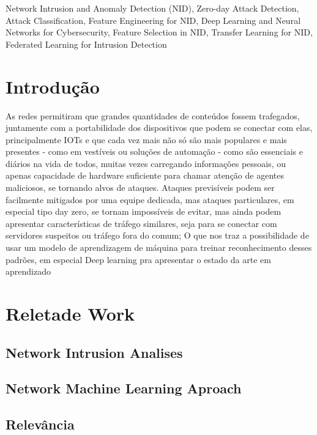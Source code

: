 \documentclass[conference]{IEEEtran}
\begin{document}
\begin{IEEEkeywords}
Network Intrusion and Anomaly Detection (NID), Zero-day Attack Detection, Attack Classification, Feature Engineering for NID, Deep Learning and Neural Networks for Cybersecurity, Feature Selection in NID, Transfer Learning for NID, Federated Learning for Intrusion Detection
\end{IEEEkeywords}

\section{Introdução}

As redes permitiram que grandes quantidades de conteúdos fossem trafegados, juntamente com a portabilidade dos dispositivos que podem se conectar com elas, principalmente IOTs e que cada vez mais não só são mais populares e mais presentes - como em vestíveis ou soluções de automação - como são essenciais e diários na vida de todos, muitas vezes carregando informações pessoais, ou apenas capacidade de hardware suficiente para chamar atenção de agentes maliciosos, se tornando alvos de ataques. Ataques previsíveis podem ser facilmente mitigados por uma equipe dedicada, mas ataques particulares, em especial tipo day zero, se tornam impossíveis de evitar, mas ainda podem apresentar características de tráfego similares, seja para se conectar com servidores suspeitos ou tráfego fora do comum; O que nos traz a possibilidade de usar um modelo de aprendizagem de máquina para treinar reconhecimento desses padrões, em especial Deep learning pra apresentar o estado da arte em aprendizado

\section{Reletade Work}

\subsection{Network Intrusion Analises}

\subsection{Network Machine Learning Aproach}

\subsection{Relevância}
\end{document}
